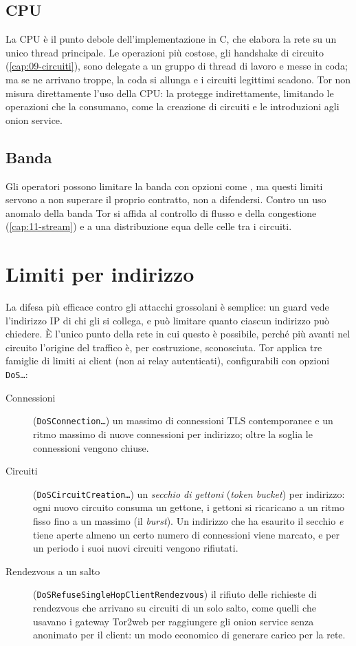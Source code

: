 \subsection{CPU}

La CPU è il punto debole dell'implementazione in C, che elabora la rete su un unico thread principale. Le operazioni più costose, gli handshake di circuito (\cref{cap:09-circuiti}), sono delegate a un gruppo di thread di lavoro e messe in coda; ma se ne arrivano troppe, la coda si allunga e i circuiti legittimi scadono. Tor non misura direttamente l'uso della CPU: la protegge indirettamente, limitando le operazioni che la consumano, come la creazione di circuiti e le introduzioni agli onion service.

\subsection{Banda}

Gli operatori possono limitare la banda con opzioni come , ma questi limiti servono a non superare il proprio contratto, non a difendersi. Contro un uso anomalo della banda Tor si affida al controllo di flusso e della congestione (\cref{cap:11-stream}) e a una distribuzione equa delle celle tra i circuiti.

\section{Limiti per indirizzo}\label{sec:dos-limiti}

La difesa più efficace contro gli attacchi grossolani è semplice: un guard vede l'indirizzo IP di chi gli si collega, e può limitare quanto ciascun indirizzo può chiedere. È l'unico punto della rete in cui questo è possibile, perché più avanti nel circuito l'origine del traffico è, per costruzione, sconosciuta. Tor applica tre famiglie di limiti ai client (non ai relay autenticati), configurabili con opzioni \texttt{DoS\ldots}:
\begin{description}
  \item[Connessioni] (\texttt{DoSConnection\ldots}) un massimo di connessioni TLS contemporanee e un ritmo massimo di nuove connessioni per indirizzo; oltre la soglia le connessioni vengono chiuse.
  \item[Circuiti] (\texttt{DoSCircuitCreation\ldots}) un \emph{secchio di gettoni} (\emph{token bucket}) per indirizzo: ogni nuovo circuito consuma un gettone, i gettoni si ricaricano a un ritmo fisso fino a un massimo (il \emph{burst}). Un indirizzo che ha esaurito il secchio \emph{e} tiene aperte almeno un certo numero di connessioni viene marcato, e per un periodo i suoi nuovi circuiti vengono rifiutati.
  \item[Rendezvous a un salto] (\texttt{DoSRefuseSingleHopClientRendezvous}) il rifiuto delle richieste di rendezvous che arrivano su circuiti di un solo salto, come quelli che usavano i gateway Tor2web per raggiungere gli onion service senza anonimato per il client: un modo economico di generare carico per la rete.
\end{description}

